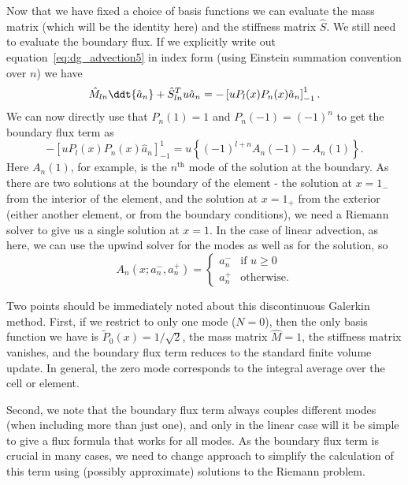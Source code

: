 Now that we have fixed a choice of basis functions we can evaluate the mass
matrix (which will be the identity here) and the stiffness matrix $\hat{S}$. We
still need to evaluate the boundary flux. If we explicitly write out equation~\ref{eq:dg_advection5}
in index form (using Einstein summation convention over $n$) we have
%
\begin{equation}
  \label{eq:dg_advection6}
  \hat{M}_{ln} \ddt{\hat{a}_n} + \hat{S}^T_{ln} u \hat{a}_n = -\left[ u P_l(x) P_n(x) \hat{a}_n \right]_{-1}^1.
\end{equation}
%
We can now directly use that $P_n(1) = 1$ and $P_n(-1) = (-1)^n$ to get the
boundary flux term as
%
\begin{equation}
  \label{eq:dg_boundary_flux_modal}
  -\left[ u P_l(x) P_n(x) \hat{a}_n \right]_{-1}^1 = u \left\{ (-1)^{l+n} A_n(-1) - A_n(1) \right\}.
\end{equation}
%
Here $A_n(1)$, for example, is the $n^{\text{th}}$ mode of the solution at the
boundary. As there are two solutions at the boundary of the element - the
solution at $x = 1_{-}$ from the interior of the element, and the solution at
$x = 1_{+}$ from the exterior (either another element, or from the boundary
conditions), we need a Riemann solver to give us a single solution at $x=1$. In
the case of linear advection, as here, we can use the upwind solver for the
modes as well as for the solution, so
%
\begin{equation}
  \label{eq:dg_riemann_solver}
  A_n(x; a^{-}_n, a^{+}_n) = \begin{cases}
    a^{-}_n & \text{if } u \ge 0 \\ a^{+}_n & \text{otherwise.}
\end{cases}
\end{equation}
%

Two points should be immediately noted about this discontinuous Galerkin method.
First, if we restrict to only one mode ($N=0$), then the only basis function we
have is $\tilde{P}_0(x) = 1 / \sqrt{2}$, the mass matrix $\hat{M} = 1$, the
stiffness matrix vanishes, and the boundary flux term reduces to the standard
finite volume update. In general, the zero mode corresponds to the integral
average over the cell or element.

Second, we note that the boundary flux term always couples different modes (when
including more than just one), and only in the linear case will it be simple to
give a flux formula that works for all modes. As the boundary flux term is
crucial in many cases, we need to change approach to simplify the calculation of
this term using (possibly approximate) solutions to the Riemann problem.

